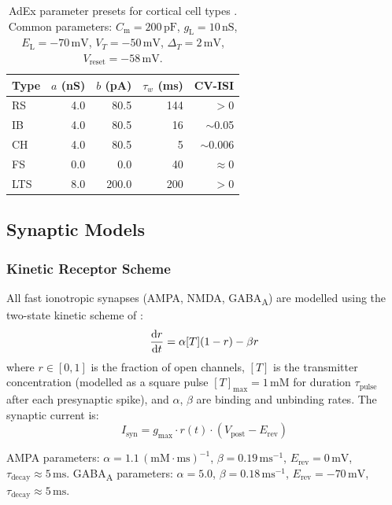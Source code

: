 \documentclass[11pt, a4paper, twocolumn]{article}
\newcommand{\Vreset}{\ensuremath{V_{\mathrm{reset}}}}
\newcommand{\EL}{\ensuremath{E_{\mathrm{L}}}}
\newcommand{\gL}{\ensuremath{g_{\mathrm{L}}}}
\newcommand{\Cm}{\ensuremath{C_{\mathrm{m}}}}
\newcommand{\tauw}{\ensuremath{\tau_{w}}}
\newcommand{\dT}{\ensuremath{\Delta_{T}}}
\newcommand{\mV}{\ensuremath{\,\mathrm{mV}}}
\newcommand{\ms}{\ensuremath{\,\mathrm{ms}}}
\newcommand{\nS}{\ensuremath{\,\mathrm{nS}}}
\newcommand{\pF}{\ensuremath{\,\mathrm{pF}}}
\begin{document}
\begin{table}[H]
\centering
\small
\caption{AdEx parameter presets for cortical cell types \citep{Naud2008}.
  Common parameters: $\Cm = 200\pF$, $\gL = 10\nS$, $\EL = -70\mV$,
  $V_T = -50\mV$, $\dT = 2\mV$, $\Vreset = -58\mV$.}
\label{tab:adex_presets}
\begin{tabular}{lrrrr}
\toprule
\textbf{Type} & \boldmath$a$ (nS) & \boldmath$b$ (pA) & \boldmath$\tauw$ (ms) & \textbf{CV-ISI} \\
\midrule
RS  & 4.0 &  80.5 & 144 & $>0$ \\
IB  & 4.0 &  80.5 &  16 & $\sim$0.05 \\
CH  & 4.0 &  80.5 &   5 & $\sim$0.006 \\
FS  & 0.0 &   0.0 &  40 & $\approx 0$ \\
LTS & 8.0 & 200.0 & 200 & $>0$ \\
\bottomrule
\end{tabular}
\end{table}

\subsection{Synaptic Models}
\label{sec:synapses}

\subsubsection{Kinetic Receptor Scheme}

All fast ionotropic synapses (AMPA, NMDA, GABA\textsubscript{A}) are modelled
using the two-state kinetic scheme of \citet{Destexhe1994}:
\begin{equation}
  \dv{r}{t} = \alpha [T](1-r) - \beta r
  \label{eq:kinetic_synapse}
\end{equation}
where $r \in [0,1]$ is the fraction of open channels, $[T]$ is the
transmitter concentration (modelled as a square pulse $[T]_{\max} = 1\,\mathrm{mM}$
for duration $\tau_{\mathrm{pulse}}$ after each presynaptic spike), and
$\alpha$, $\beta$ are binding and unbinding rates. The synaptic current is:
\begin{equation}
  I_{\mathrm{syn}} = g_{\max} \cdot r(t) \cdot (V_{\mathrm{post}} - E_{\mathrm{rev}})
  \label{eq:syn_current}
\end{equation}

AMPA parameters: $\alpha = 1.1\,(\mathrm{mM \cdot ms})^{-1}$,
$\beta = 0.19\,\mathrm{ms}^{-1}$, $E_{\mathrm{rev}} = 0\mV$,
$\tau_{\mathrm{decay}} \approx 5\ms$.
GABA\textsubscript{A} parameters: $\alpha = 5.0$, $\beta = 0.18\,\mathrm{ms}^{-1}$,
$E_{\mathrm{rev}} = -70\mV$, $\tau_{\mathrm{decay}} \approx 5\ms$.
\end{document}
